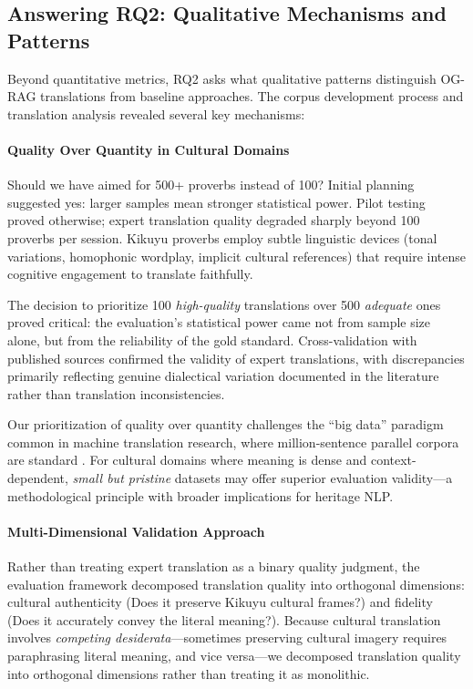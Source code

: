 \subsection{Answering RQ2: Qualitative Mechanisms and Patterns}
\label{subsec:rq2_interpretation}

Beyond quantitative metrics, RQ2 asks what qualitative patterns distinguish OG-RAG translations from baseline approaches. The corpus development process and translation analysis revealed several key mechanisms:

\paragraph{Quality Over Quantity in Cultural Domains}

Should we have aimed for 500+ proverbs instead of 100? Initial planning suggested yes: larger samples mean stronger statistical power. Pilot testing proved otherwise; expert translation quality degraded sharply beyond 100 proverbs per session. Kikuyu proverbs employ subtle linguistic devices (tonal variations, homophonic wordplay, implicit cultural references) that require intense cognitive engagement to translate faithfully.

The decision to prioritize 100 \emph{high-quality} translations over 500 \emph{adequate} ones proved critical: the evaluation's statistical power came not from sample size alone, but from the reliability of the gold standard. Cross-validation with published sources confirmed the validity of expert translations, with discrepancies primarily reflecting genuine dialectical variation documented in the literature rather than translation inconsistencies.

Our prioritization of quality over quantity challenges the ``big data'' paradigm common in machine translation research, where million-sentence parallel corpora are standard \citep{goyal2022flores}. For cultural domains where meaning is dense and context-dependent, \emph{small but pristine} datasets may offer superior evaluation validity—a methodological principle with broader implications for heritage NLP.

\paragraph{Multi-Dimensional Validation Approach}

Rather than treating expert translation as a binary quality judgment, the evaluation framework decomposed translation quality into orthogonal dimensions: cultural authenticity (Does it preserve Kikuyu cultural frames?) and fidelity (Does it accurately convey the literal meaning?). Because cultural translation involves \emph{competing desiderata}—sometimes preserving cultural imagery requires paraphrasing literal meaning, and vice versa—we decomposed translation quality into orthogonal dimensions rather than treating it as monolithic.

